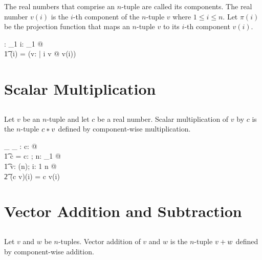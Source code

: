 \documentclass[11pt, oneside]{article}
\begin{document}
\subsubsection{}

The real numbers that comprise an $n$-tuple are called its components.
The real number $v(i)$ is the $i$-th component of the $n$-tuple $v$ where
$1 \le i \le n$.
Let $\pi(i)$ be the projection function that maps an $n$-tuple $v$ to its $i$-th component $v(i)$.

\begin{axdef}
	\pi: \nat_1 \fun \Rinf \pfun \R
\where
	\forall i: \nat_1 @ \\
	\t1	\pi(i) = (\lambda v: \Rinf | i \in \dom v @ v(i))
\end{axdef}

\section{Scalar Multiplication}

\subsection{}

Let $v$ be an $n$-tuple and let $c$ be a real number.
Scalar multiplication of $v$ by $c$ is the $n$-tuple $c \mathbin{*} v$ defined by component-wise multiplication.

\begin{axdef}
	\_ \smulR \_ : \R \cross \Rinf \fun \Rinf 
\where
	\forall c: \R @ \\
	\t1	c \smulR \langle \rangle = \langle \rangle
\also
	\forall c: \R; n: \nat_1 @ \\
	\t1	\forall v: \Rtuples(n); i: 1 \upto n @ \\
	\t2		(c \smulR v)(i) = c \mulR v(i)
\end{axdef}

\section{Vector Addition and Subtraction}

\subsection{}

Let $v$ and $w$ be $n$-tuples.
Vector addition of $v$ and $w$ is the $n$-tuple $v \mathbin{+} w$ defined by component-wise addition.
\end{document}
